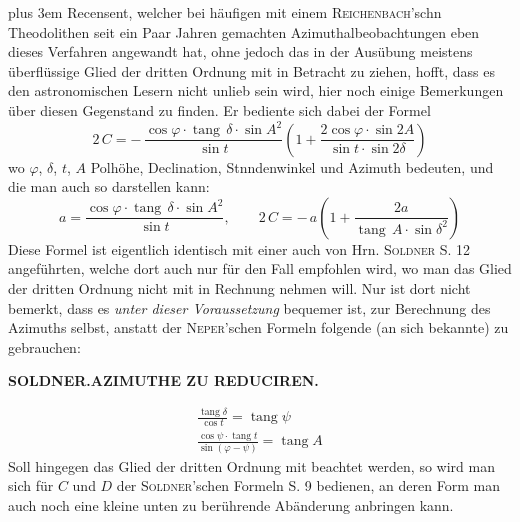 \begingroup\rightskip=0pt plus 3em
Recensent, welcher bei häufigen mit einem \textsc{Reichenbach}'schn
 Theodolithen seit ein Paar Jahren gemachten Azimuthalbeobachtungen eben dieses Verfahren angewandt hat, ohne jedoch das in der Ausübung meistens überflüssige Glied der dritten Ordnung mit in Betracht zu ziehen, hofft, dass es den astronomischen Lesern nicht unlieb sein wird, hier noch einige Bemerkungen über diesen Gegenstand zu finden. Er bediente sich dabei der Formel
\[
2\,C = -\,\frac{\cos\varphi\cdot \operatorname{tang}\,\delta\cdot \sin A^2}{\sin t}
\left(1 + \frac{2\cos\varphi\cdot \sin 2A}{\sin t\cdot \sin 2\delta}\right)
\]
wo $\varphi$, $\delta$, $t$, $A$ Polhöhe, Declination, Stnndenwinkel
 und Azimuth bedeuten, und die man auch so darstellen kann:
\[
a = \frac{\cos\varphi\cdot \operatorname{tang}\,\delta\cdot \sin A^2}{\sin t}, \qquad
2\,C = -\,a\left(1 + \frac{2a}{\operatorname{tang}\,A\cdot \sin\delta^2}\right)
\]
Diese Formel ist eigentlich identisch mit einer auch von Hrn. \textsc{Soldner} S. 12 angeführten, welche dort auch nur für den Fall empfohlen wird, wo man das Glied der dritten Ordnung nicht mit in Rechnung nehmen will. Nur ist dort nicht bemerkt, dass es \emph{unter dieser Voraussetzung} bequemer ist, zur Berechnung des Azimuths selbst, anstatt der \textsc{Neper}'schen Formeln folgende (an sich bekannte) zu gebrauchen:\par
\clearpage
\thispagestyle{empty}
\noindent{}%
\makebox[12mm][l]{}%
\parbox[t]{\dimexpr\linewidth-24mm\relax}{\centering\footnotesize\bfseries SOLDNER.\enspace AZIMUTHE ZU REDUCIREN.\par}%
\par\medskip
\[
\begin{gathered}
\frac{\operatorname{tang}\delta}{\cos t}=\operatorname{tang}\psi\\[5pt]
\frac{\cos\psi\cdot\operatorname{tang}t}{\sin(\varphi-\psi)}=\operatorname{tang}A
\end{gathered}
\]
Soll hingegen das Glied der dritten Ordnung mit beachtet werden, so wird man sich für $C$ und $D$ der \textsc{Soldner}'schen Formeln S. 9 bedienen, an deren Form man auch noch eine kleine unten zu berührende Abänderung anbringen kann.\par\endgroup

